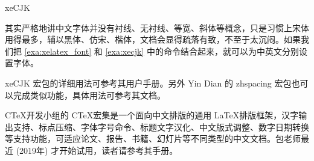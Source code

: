 \begin{example}[h]
\begin{Code}[numbers=left]
\usepackage[CJKchecksingle,CJKnumber]{xeCJK}
\end{Code}
\caption{xeCJK}
\label{exa:xecjk}
\end{example}

其实严格地讲中文字体并没有衬线、无衬线、等宽、斜体等概念，只是习惯上宋体用得最多，辅以黑体、仿宋、楷体，文档会显得疏落有致，不至于太沉闷。如果我们把 \autoref{exa:xelatex_font} 和 \autoref{exa:xecjk} 中的命令结合起来，就可以为中英文分别设置字体。

xeCJK 宏包的详细用法可参考其用户手册\citep{Sun_xecjk}。另外 Yin Dian 的 zhspacing 宏包也可以完成类似功能，具体用法可参考其文档\citep{Yin_zhspacing}。

C\TeX 开发小组的 C\TeX 宏集是一个面向中文排版的通用 \LaTeX 排版框架，汉字输出支持、标点压缩、字体字号命令、标题文字汉化、中文版式调整、数字日期转换等支持功能，可适应论文、报告、书籍、幻灯片等不同类型的中文文档。包老师最近 (2019年) 才开始试用，读者请参考其手册\citep{CTeX_ctex}。



